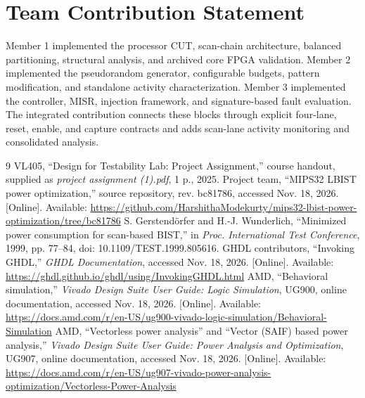\documentclass[conference,a4paper]{IEEEtran}
\begin{document}
\section{Team Contribution Statement}
Member 1 implemented the processor CUT, scan-chain architecture, balanced
partitioning, structural analysis, and archived core FPGA validation.
Member 2 implemented the pseudorandom generator, configurable budgets,
pattern modification, and standalone activity characterization.
Member 3 implemented the controller, MISR, injection framework, and
signature-based fault evaluation. The integrated contribution connects these
blocks through explicit four-lane, reset, enable, and capture contracts and
adds scan-lane activity monitoring and consolidated analysis.



\begin{thebibliography}{9}
 VL405, ``Design for Testability Lab: Project Assignment,''
course handout, supplied as \emph{project assignment (1).pdf}, 1 p., 2025.
 Project team, ``MIPS32 LBIST power optimization,'' source
repository, rev. bc81786, accessed Nov. 18, 2026. [Online]. Available:
\url{https://github.com/HarshithaModekurty/mips32-lbist-power-optimization/tree/bc81786}
 S. Gerstend\"orfer and H.-J. Wunderlich,
``Minimized power consumption for scan-based BIST,'' in \emph{Proc. International
Test Conference}, 1999, pp. 77--84, doi: 10.1109/TEST.1999.805616.
 GHDL contributors, ``Invoking GHDL,'' \emph{GHDL Documentation},
accessed Nov. 18, 2026. [Online]. Available:
\url{https://ghdl.github.io/ghdl/using/InvokingGHDL.html}
 AMD, ``Behavioral simulation,'' \emph{Vivado Design Suite User
Guide: Logic Simulation}, UG900, online documentation, accessed Nov. 18, 2026.
[Online]. Available:
\url{https://docs.amd.com/r/en-US/ug900-vivado-logic-simulation/Behavioral-Simulation}
 AMD, ``Vectorless power analysis'' and ``Vector (SAIF) based
power analysis,'' \emph{Vivado Design Suite User Guide: Power Analysis and
Optimization}, UG907, online documentation, accessed Nov. 18, 2026. [Online].
Available: \url{https://docs.amd.com/r/en-US/ug907-vivado-power-analysis-optimization/Vectorless-Power-Analysis}
\end{thebibliography}
\end{document}
